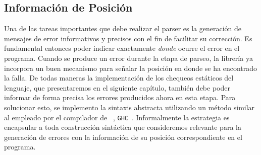 \subsection{Información de Posición}

Una de las tareas importantes que debe realizar el parser es la generación de mensajes de error informativos y precisos con el fin de facilitar su corrección. Es fundamental entonces poder indicar exactamente  \textit{donde} ocurre el error en el programa.
Cuando se produce un error durante la etapa de parseo, la librería \Megaparsec{} ya incorpora un buen mecanismo para señalar la posición en donde se ha encontrado la falla.
De todas maneras la implementación de los chequeos estáticos del lenguaje, que presentaremos en el siguiente capítulo, también debe poder informar de forma precisa los errores producidos ahora en esta etapa.
Para solucionar esto, se implemento la sintaxis abstracta utilizando un método similar al empleado por el compilador de \Haskell{}~\cite{marlow2010haskell}, \texttt{GHC}~\cite{GHC}.
Informalmente la estrategia es encapsular a toda construcción sintáctica que consideremos relevante para la generación de errores con la información de su posición correspondiente en el programa.



